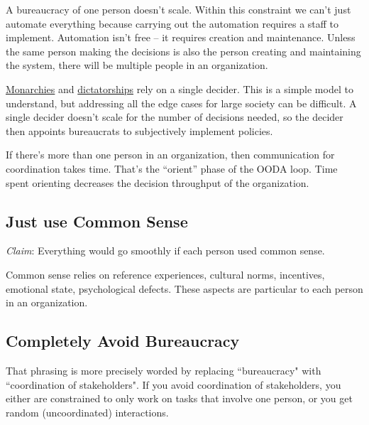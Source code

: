 A bureaucracy of one person doesn't scale. Within this constraint we can't just automate everything because carrying out the automation requires a staff to implement. 
Automation isn't free -- it requires creation and maintenance. Unless the same person making the decisions is also the person creating and maintaining the system, there will be multiple people in an organization.


\href{https://en.wikipedia.org/wiki/Monarchy}{Monarchies} and \href{https://en.wikipedia.org/wiki/Dictator}{dictatorships} rely on a single decider. This is a simple model to understand, but addressing all the edge cases for large society can be difficult. A single decider doesn't scale for the number of decisions needed, so the decider then appoints bureaucrats to subjectively implement policies. 



If there's more than one person in an organization, then communication for coordination takes time. That's the ``orient'' phase of the OODA loop. Time spent orienting decreases the decision throughput of the organization.



\subsection*{Just use Common Sense}
\textit{Claim}: Everything would go smoothly if each person used common sense.

Common sense relies on reference experiences, cultural norms, incentives, emotional state, psychological defects. These aspects are particular to each person in an organization. 


\subsection*{Completely Avoid Bureaucracy}
That phrasing is more precisely worded by replacing ``bureaucracy" with ``coordination of stakeholders". If you avoid coordination of stakeholders, you either are constrained to only work on tasks that involve one person, or you get random (uncoordinated) interactions. 

